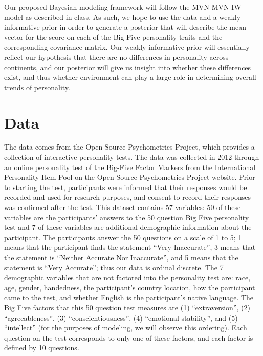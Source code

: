\documentclass[
]{article}
\begin{document}
Our proposed Bayesian modeling framework will follow the MVN-MVN-IW
model as described in class. As such, we hope to use the data and a
weakly informative prior in order to generate a posterior that will
describe the mean vector for the score on each of the Big Five
personality traits and the corresponding covariance matrix. Our weakly
informative prior will essentially reflect our hypothesis that there are
no differences in personality across continents, and our posterior will
give us insight into whether these differences exist, and thus whether
environment can play a large role in determining overall trends of
personality.

\hypertarget{data}{%
\section{Data}\label{data}}

The data comes from the Open-Source Psychometrics Project, which
provides a collection of interactive personality tests. The data was
collected in 2012 through an online personality test of the Big-Five
Factor Markers from the International Personality Item Pool on the
Open-Source Psychometrics Project website. Prior to starting the test,
participants were informed that their responses would be recorded and
used for research purposes, and consent to record their responses was
confirmed after the test. This dataset contains 57 variables: 50 of
these variables are the participants' answers to the 50 question Big
Five personality test and 7 of these variables are additional
demographic information about the participant. The participants answer
the 50 questions on a scale of 1 to 5; 1 means that the participant
finds the statement ``Very Inaccurate'', 3 means that the statement is
``Neither Accurate Nor Inaccurate'', and 5 means that the statement is
``Very Accurate''; thus our data is ordinal discrete. The 7 demographic
variables that are not factored into the personality test are: race,
age, gender, handedness, the participant's country location, how the
participant came to the test, and whether English is the participant's
native language. The Big Five factors that this 50 question test
measures are (1) ``extraversion'', (2) ``agreeableness'', (3)
``conscientiousness'', (4) ``emotional stability'', and (5)
``intellect'' (for the purposes of modeling, we will observe this
ordering). Each question on the test corresponds to only one of these
factors, and each factor is defined by 10 questions.
\end{document}
